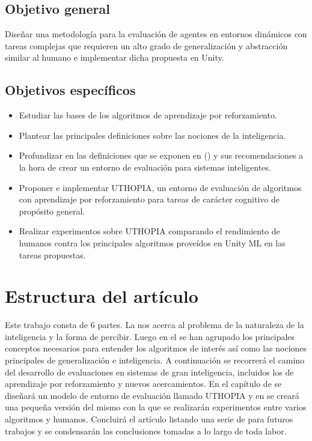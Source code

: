 \subsection*{Objetivo general}
Diseñar una metodología para la evaluación de agentes en entornos dinámicos con tareas complejas que requieren un alto grado de generalización y abstracción similar al humano e implementar dicha propuesta en Unity.


\subsection*{Objetivos específicos}
\begin{itemize}
    \item Estudiar las bases de los algoritmos de aprendizaje por reforzamiento.
    \item Plantear las principales definiciones sobre las nociones de la inteligencia.
    \item Profundizar en las definiciones que se exponen en (\cite{chollet2019measure}) y sus recomendaciones a la hora de crear un entorno de evaluación para sistemas inteligentes.
    \item Proponer e implementar UTHOPIA, un entorno de evaluación de algoritmos con aprendizaje por reforzamiento para tareas de carácter cognitivo de propósito general.
    \item Realizar experimentos sobre UTHOPIA comparando el rendimiento de humanos contra los principales algoritmos proveídos en Unity ML en las tareas propuestas.
\end{itemize}

\section*{Estructura del artículo}
Este trabajo consta de 6 partes. La  nos acerca al problema de la naturaleza de la inteligencia y la forma de percibir. Luego en el  se han agrupado los principales conceptos necesarios para entender los algoritmos de interés así como las nociones principales de generalización e inteligencia. A continuación se recorrerá el camino del desarrollo de evaluaciones en sistemas de gran inteligencia, incluidos los de aprendizaje por reforzamiento y nuevos acercamientos. En el capítulo de  se diseñará un modelo de entorno de evaluación llamado UTHOPIA y en  se creará una pequeña versión del mismo con la que se realizarán experimentos entre varios algoritmos y humanos. Concluirá el artículo listando una serie de  para futuros trabajos y se condensarán las conclusiones tomadas a lo largo de toda labor. 


